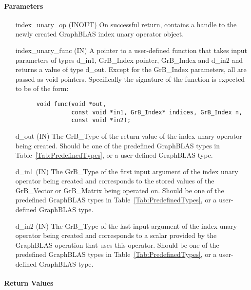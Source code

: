 \paragraph{Parameters}

\begin{itemize}[leftmargin=1.2in]
    \item[{\sf index\_unary\_op}] ({\sf INOUT}) On successful return, contains a 
          handle to the newly created GraphBLAS index unary operator object.
    \item[{\sf index\_unary\_func}] ({\sf IN}) A pointer to a user-defined 
          function that takes input parameters of types {\sf d\_in1}, 
          {\sf GrB\_Index} pointer, {\sf GrB\_Index} and {\sf d\_in2}
          and returns a value of type {\sf d\_out}.  Except for the {\sf GrB\_Index}
          parameters, all are passed as {\sf void} pointers.
          Specifically the signature of the function is expected to 
          be of the form:
      \begin{verbatim}
      void func(void *out,
                const void *in1, GrB_Index* indices, GrB_Index n, 
                const void *in2);
      \end{verbatim}
    \item[{\sf d\_out}]  ({\sf IN}) The {\sf GrB\_Type} of the return
          value of the index unary operator being created. Should be one of the
          predefined GraphBLAS types in Table~\ref{Tab:PredefinedTypes}, or a 
          user-defined GraphBLAS type.
    \item[{\sf d\_in1}]  ({\sf IN}) The {\sf GrB\_Type} of the first input 
          argument of the index unary operator being created and corresponds to
          the stored values of the {\sf GrB\_Vector} or {\sf GrB\_Matrix} being
          operated on. Should be one of the predefined GraphBLAS types in
          Table~\ref{Tab:PredefinedTypes}, or a user-defined GraphBLAS type.
    \item[{\sf d\_in2}]  ({\sf IN}) The {\sf GrB\_Type} of the last input
          argument of the index unary operator being created and corresponds to
          a scalar provided by the GraphBLAS operation that uses this operator.
          Should be one of the predefined GraphBLAS types in 
          Table~\ref{Tab:PredefinedTypes}, or a user-defined GraphBLAS type.
\end{itemize}

\paragraph{Return Values}

